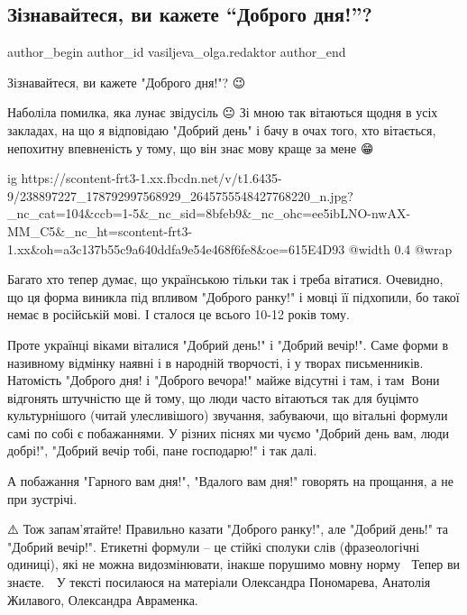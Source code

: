 
 
 
 
 
 
\subsection{Зізнавайтеся, ви кажете \enquote{Доброго дня!}?}
\label{sec:17_08_2021.fb.vasiljeva_olga.redaktor.1.dobrogo_dnja}
 
\ifcmt
 author_begin
   author_id vasiljeva_olga.redaktor
 author_end
\fi

Зізнавайтеся, ви кажете "Доброго дня!"? 😉

Наболіла помилка, яка лунає звідусіль 😐 Зі мною так вітаються щодня в усіх
закладах, на що я відповідаю "Добрий день" і бачу в очах того, хто вітається,
непохитну впевненість у тому, що він знає мову краще за мене 😁

\ifcmt
  ig https://scontent-frt3-1.xx.fbcdn.net/v/t1.6435-9/238897227_178792997568929_2645755548427768220_n.jpg?_nc_cat=104&ccb=1-5&_nc_sid=8bfeb9&_nc_ohc=ee5ibLNO-nwAX-MM_C5&_nc_ht=scontent-frt3-1.xx&oh=a3c137b55c9a640ddfa9e54e468f6fe8&oe=615E4D93
  @width 0.4
  @wrap \parpic[r]
\fi

Багато хто тепер думає, що українською тільки так і треба вітатися. Очевидно,
що ця форма виникла під впливом "Доброго ранку!" і мовці її підхопили, бо такої
немає в російській мові. І сталося це всього 10-12 років тому.

Проте українці віками віталися "Добрий день!" і "Добрий вечір!". Саме форми в
називному відмінку наявні і в народній творчості, і у творах письменників.
Натомість "Доброго дня! і "Доброго вечора!" майже відсутні і там, і там☝🏻Вони
відгонять штучністю ще й тому, що люди часто вітаються так для буцімто
культурнішого (читай улесливішого) звучання, забуваючи, що вітальні формули
самі по собі є побажаннями. У різних піснях ми чуємо "Добрий день вам, люди
добрі!", "Добрий вечір тобі, пане господарю!" і так далі.

А побажання "Гарного вам дня!", "Вдалого вам дня!" говорять на прощання, а не
при зустрічі.

⚠️ Тож запам'ятайте! Правильно казати "Доброго ранку!", але "Добрий день!" та
"Добрий вечір!".  Етикетні формули – це стійкі сполуки слів (фразеологічні
одиниці), які не можна видозмінювати, інакше порушимо мовну норму☝🏻 Тепер ви
знаєте.  📖 У тексті посилаюся на матеріали Олександра Пономарева, Анатолія
Жилавого, Олександра Авраменка.
